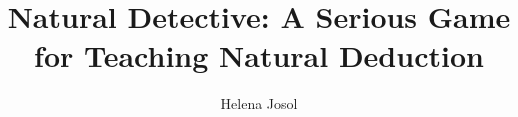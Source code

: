 \documentclass[a4paper,11pt]{article}
\title{Natural Detective: A Serious Game for Teaching Natural Deduction}
\author{Helena Josol}
\date{}
\begin{document}
  
\maketitle

\begin{abstract}
\end{abstract}
\end{document}
